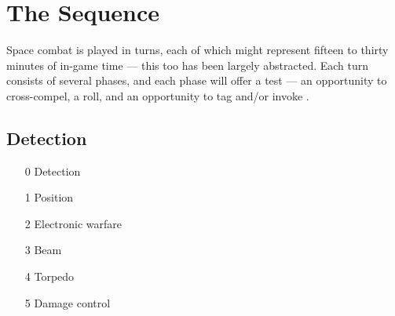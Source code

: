 \section{The Sequence}\label{sec:The Sequence}

Space combat is played in turns, each of which might represent fifteen to thirty minutes of in-game time --- this too has been largely abstracted. Each turn consists of several phases, and each phase will offer a test --- an opportunity to cross-compel, a roll, and an opportunity to tag and/or invoke \Aspects.

\subsection{Detection}
\label{sec:Detection}



\begin{wraptable}{r}[\sidebarwidth]{5cm}
\centering
\newsavebox{\hbbox}%
\begin{lrbox}{\hbbox}
\begin{minipage}[c]{4.5cm}
\begin{enumerate}
\item [0] Detection
\item [1] Position
\item [2] Electronic warfare
\item [3] Beam
\item [4] Torpedo
\item [5] Damage control
\end{enumerate}
\end{minipage}
\end{lrbox}
\colorbox{sbbackground}{\usebox{\hbbox}}
\end{wraptable}

